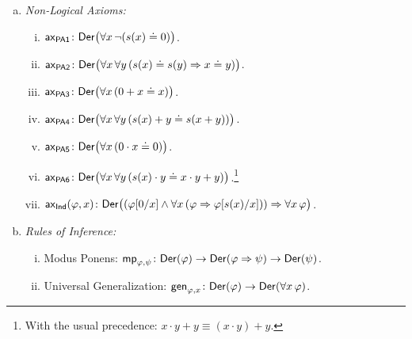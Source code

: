 \begin{defn}[Derivations]
\begin{enumerate}[a),font=\upshape]
\begin{enumerate}[i),font=\upshape]
            \item $\fun{ax}_{\fun{Eq2}}(\varphi,z,t_1,t_2)\colon\fun{Der}\bigl(t_1\doteq t_2\imp(\varphi[t_1/z]\imp\varphi[t_2/z])\bigr)$, where $t_1$ and $t_2$ are free for $z$ in $\varphi$.
        \end{enumerate}
        
        \item\textsl{Non-Logical Axioms:}
        \begin{enumerate}[i),font=\upshape]
            \item $\fun{ax}_{\fun{PA1}}\colon\fun{Der}\bigl(\forall x\,\neg(s(x)\doteq0)\bigr)$.
            
            \item $\fun{ax}_{\fun{PA2}}\colon\fun{Der}\bigl(\forall x\,\forall y\,(s(x)\doteq s(y)\imp x\doteq y)\bigr)$.
            
            \item $\fun{ax}_{\fun{PA3}}\colon\fun{Der}\bigl(\forall x\,(0+x\doteq x)\bigr)$.

            \item $\fun{ax}_{\fun{PA4}}\colon\fun{Der}\bigl(\forall x\,\forall y\,(s(x)+y\doteq s(x+y))\bigr)$.

            \item $\fun{ax}_{\fun{PA5}}\colon\fun{Der}\bigl(\forall x\,(0\cdot x\doteq0)\bigr)$.

            \item $\fun{ax}_{\fun{PA6}}\colon\fun{Der}\bigl(\forall x\,\forall y\,(s(x)\cdot y\doteq x\cdot y+y)\bigr)$.\footnote{With the usual precedence: $x\cdot y+y\equiv(x\cdot y)+y$.}

            \item $\fun{ax}_{\fun{Ind}}(\varphi,x)\colon
                \fun{Der}\bigl(
                    (
                        \varphi[0/x]\land\forall x\,
                        (\varphi\imp\varphi[s(x)/x])
                    )
                    \imp\forall x\,\varphi
                \bigr)$.
        \end{enumerate}
        \item \textsl{Rules of Inference:}
        \begin{enumerate}[i),font=\upshape]
            \item Modus Ponens: $\fun{mp}_{\varphi,\psi}\colon\fun{Der}(\varphi)\to\fun{Der}(\varphi\imp\psi)\to\fun{Der}(\psi)$.
            
            \item Universal Generalization: $\fun{gen}_{\varphi,x}\colon\fun{Der}(\varphi)\to\fun{Der}(\forall x\,\varphi)$.
        \end{enumerate}
    \end{enumerate}
\end{defn}

